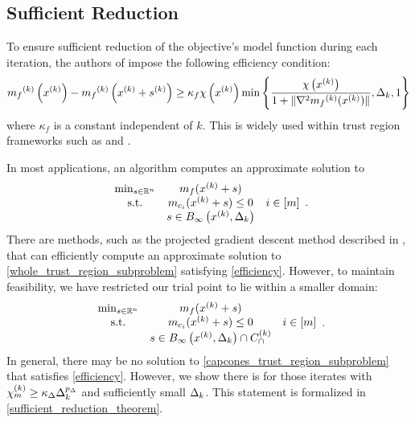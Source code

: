 \subsection{Sufficient Reduction}
\label{sufficient_reduction_section}

To ensure sufficient reduction of the objective's model function during each iteration, the authors of \cite{Conejo:2013:GCT:2620806.2621814} impose the following efficiency condition:
\begin{align}
{{m}_f}^{(k)}\left(x^{(k)}\right) - {{m}_f}^{(k)}\left(x^{(k)} + {{s}^{(k)}}\right) \ge \kappa_f \chi\left(x^{(k)}\right) \min\left\{ \frac{\chi\left(x^{(k)}\right)}{1+\|\nabla^2 {{m}_f}^{(k)}(x^{(k)})\|}, \Delta_k, 1 \right\}
\end{align}
where $\kappa_f$ is a constant independent of $k$.
This is widely used within trust region frameworks such as \cite{Conejo:2013:GCT:2620806.2621814} and \cite{Conn:2000:TM:357813}.

In most applications, an algorithm computes an approximate solution to
\begin{align}
\label{whole_trust_region_subproblem}
\begin{array}{ccc}
\min_{s \in \mathbb R^n} & m_{f}(x^{(k)} + s) & \\
\textrm{s.t.} & m_{c_i}(x^{(k)} + s) \le 0 & i \in [m]\\
& s \in { B_{\infty}\left(x^{(k)}, \Delta_k\right) } & \\
\end{array}.
\end{align}
There are methods, such as the projected gradient descent method described in \cite{Conn:2000:TM:357813},
that can efficiently compute an approximate solution to \cref{whole_trust_region_subproblem} satisfying \cref{efficiency}.
However, to maintain feasibility, we have restricted our trial point to lie within a smaller domain:
\begin{align}
\label{capcones_trust_region_subproblem}
\begin{array}{ccc}
\min_{s \in \mathbb R^n} & m_{f}(x^{(k)} + s) & \\
\textrm{s.t.} & m_{c_i}(x^{(k)} + s) \le 0 & i \in [m]\\
& s \in { B_{\infty}\left(x^{(k)}, \Delta_k\right) } \cap {C^{(k)}_{\cap}} &
\end{array}.
\end{align}
In general, there may be no solution to \cref{capcones_trust_region_subproblem} that satisfies \cref{efficiency}.
However, we show there is for those iterates with ${\chi_m^{(k)}} \ge \kappa_{\Delta}\Delta_k^{p_{\Delta}}$ and sufficiently small $\Delta_k$.
This statement is formalized in \cref{sufficient_reduction_theorem}.

